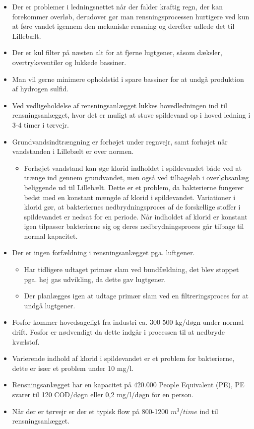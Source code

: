 \begin{itemize}
	\item Der er problemer i ledningsnettet når der falder kraftig regn, der kan forekommer overløb, derudover gør man rensningsprocessen hurtigere ved kun at føre vandet igennem den mekaniske rensning og derefter udlede det til Lillebælt. 
	\item Der er kul filter på næsten alt for at fjerne lugtgener, såsom dæksler, overtryksventiler og lukkede bassiner. 
	\item Man vil gerne minimere opholdstid i spare bassiner for at undgå produktion af hydrogen sulfid. 
	\item Ved vedligeholdelse af rensningsanlægget lukkes hovedledningen ind til rensningsanlægget, hvor det er muligt at stuve spildevand op i hoved ledning i 3-4 timer i tørvejr.
	\item Grundvandsindtrængning er forhøjet under regnvejr, samt forhøjet når vandstanden i Lillebælt er over normen.
	\begin{itemize}
		\item Forhøjet vandstand kan øge klorid indholdet i spildevandet både ved at trænge ind gennem grundvandet, men også ved tilbageløb i overløbsanlæg beliggende ud til Lillebælt. Dette er et problem, da bakterierne fungerer bedst med en konstant mængde af klorid i spildevandet. Variationer i klorid gør, at bakteriernes nedbrydningsproces af de forskellige stoffer i spildevandet er nedsat for en periode. Når indholdet af klorid er konstant igen tilpasser bakterierne sig og deres nedbrydningsproces går tilbage til normal kapacitet.
	\end{itemize}
	\item Der er ingen forfældning i rensningsanlægget pga. luftgener. 
	\begin{itemize}
		\item Har tidligere udtaget primær slam ved bundfældning, det blev stoppet pga. høj gas udvikling, da dette gav lugtgener.
		\item Der planlægges igen at udtage primær slam ved en filtreringsproces for at undgå lugtgener.
	\end{itemize}
	\item Fosfor kommer hovedsageligt fra industri ca. 300-500 kg/døgn under normal drift. Fosfor er nødvendigt da dette indgår i processen til at nedbryde kvælstof.
	\item Varierende indhold af klorid i spildevandet er et problem for bakterierne, dette er især et problem under 10 mg/l.
	\item Rensningsanlægget har en kapacitet på 420.000 People Equivalent (PE), PE svarer til 120 COD/døgn eller 0,2 mg/l/døgn for en person.
	\item Når der er tørvejr er der et typisk flow på 800-1200 $m^3/time$ ind til rensningsanlægget.
\end{itemize}
